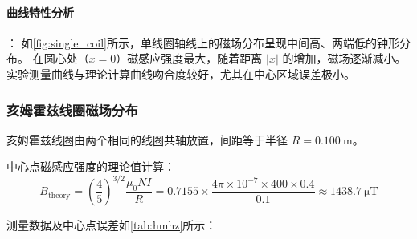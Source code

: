 \documentclass{../template/Report}%
\begin{document}
\begin{fullreportonly}
    \paragraph{曲线特性分析}：
    如\cref{fig:single_coil}所示，单线圈轴线上的磁场分布呈现中间高、两端低的钟形分布。
    在圆心处（$x=0$）磁感应强度最大，随着距离 $|x|$ 的增加，磁场逐渐减小。
    实验测量曲线与理论计算曲线吻合度较好，尤其在中心区域误差极小。

    \subsubsection{亥姆霍兹线圈磁场分布}
    亥姆霍兹线圈由两个相同的线圈共轴放置，间距等于半径 $R=\SI{0.100}{\meter}$。

    中心点磁感应强度的理论值计算：
    \begin{equation*}
        B_{\text{theory}} = \left(\frac{4}{5}\right)^{3/2} \frac{\mu_0 N I}{R} = 0.7155 \times \frac{4\pi \times 10^{-7} \times 400 \times 0.4}{0.1} \approx \SI{1438.7}{\micro\tesla}
    \end{equation*}

    测量数据及中心点误差如\cref{tab:hmhz}所示：


\end{fullreportonly}
\end{document}
